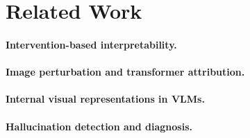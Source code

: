 \section{Related Work}


\paragraph{Intervention-based interpretability.}

\paragraph{Image perturbation and transformer attribution.}

\paragraph{Internal visual representations in VLMs.}

\paragraph{Hallucination detection and diagnosis.}
